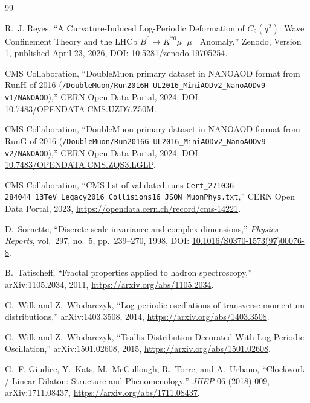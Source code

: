 \documentclass[11pt]{article}
\begin{document}
\begin{thebibliography}{99}

R.~J. Reyes,
\newblock ``A Curvature-Induced Log-Periodic Deformation of \(C_9(q^2)\):
Wave Confinement Theory and the LHCb
\(B^0\to K^{*0}\mu^+\mu^-\) Anomaly,''
\newblock Zenodo, Version 1, published April 23, 2026,
\newblock DOI: \href{https://doi.org/10.5281/zenodo.19705254}
{10.5281/zenodo.19705254}.

CMS Collaboration,
\newblock ``DoubleMuon primary dataset in NANOAOD format from RunH of 2016
(\texttt{/DoubleMuon/Run2016H-UL2016\_MiniAODv2\_NanoAODv9-v1/NANOAOD}),''
\newblock CERN Open Data Portal, 2024,
\newblock DOI:
\href{https://doi.org/10.7483/OPENDATA.CMS.UZD7.Z50M}
{10.7483/OPENDATA.CMS.UZD7.Z50M}.

CMS Collaboration,
\newblock ``DoubleMuon primary dataset in NANOAOD format from RunG of 2016
(\texttt{/DoubleMuon/Run2016G-UL2016\_MiniAODv2\_NanoAODv9-v2/NANOAOD}),''
\newblock CERN Open Data Portal, 2024,
\newblock DOI:
\href{https://doi.org/10.7483/OPENDATA.CMS.ZQS3.LGLP}
{10.7483/OPENDATA.CMS.ZQS3.LGLP}.

CMS Collaboration,
\newblock ``CMS list of validated runs
\texttt{Cert\_271036-284044\_13TeV\_Legacy2016\_Collisions16\_JSON\_MuonPhys.txt},''
\newblock CERN Open Data Portal, 2023,
\newblock \url{https://opendata.cern.ch/record/cms-14221}.

D.~Sornette,
\newblock ``Discrete-scale invariance and complex dimensions,''
\newblock \emph{Physics Reports}, vol.~297, no.~5, pp.~239--270, 1998,
\newblock DOI:
\href{https://doi.org/10.1016/S0370-1573(97)00076-8}
{10.1016/S0370-1573(97)00076-8}.

B.~Tatischeff,
\newblock ``Fractal properties applied to hadron spectroscopy,''
\newblock arXiv:1105.2034, 2011,
\newblock \url{https://arxiv.org/abs/1105.2034}.

G.~Wilk and Z.~W{\l}odarczyk,
\newblock ``Log-periodic oscillations of transverse momentum distributions,''
\newblock arXiv:1403.3508, 2014,
\newblock \url{https://arxiv.org/abs/1403.3508}.

G.~Wilk and Z.~W{\l}odarczyk,
\newblock ``Tsallis Distribution Decorated With Log-Periodic Oscillation,''
\newblock arXiv:1501.02608, 2015,
\newblock \url{https://arxiv.org/abs/1501.02608}.

G.~F. Giudice, Y.~Kats, M.~McCullough, R.~Torre, and A.~Urbano,
\newblock ``Clockwork / Linear Dilaton: Structure and Phenomenology,''
\newblock \emph{JHEP} 06 (2018) 009,
\newblock arXiv:1711.08437,
\newblock \url{https://arxiv.org/abs/1711.08437}.

\end{thebibliography}
\end{document}
